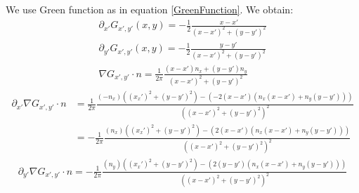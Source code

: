 \documentclass[a4paper,12pt]{article}
\begin{document}
We use Green function as in equation \ref{GreenFunction}. We obtain:
\begin{align}
 \partial_{x'} G_{x',y'}(x,y)=-\frac{1}{2}\frac{x-x'}{(x-x')^2+(y-y')^2}\\ \label{partialxaG}
\partial_{y'} G_{x',y'}(x,y)=-\frac{1}{2}\frac{y-y'}{(x-x')^2+(y-y')^2} \\ \label{partialyaG}
\nabla G_{x',y'} \cdot n= \frac{1}{2\pi} \frac{(x-x')n_x+(y-y')n_y}{(x-x')^2+(y-y')^2}
\end{align}
\begin{align}
 \partial_{x'}\nabla G_{x',y'} \cdot n &=\frac{1}{2\pi} \frac{(-n_x)((x_x')^2+(y-y')^2)-(-2(x-x')(n_x(x-x')+n_y(y-y')))}{((x-x')^2+(y-y')^2)^2}\\
&= -\frac{1}{2\pi}  \frac{(n_x)((x_x')^2+(y-y')^2)-(2(x-x')(n_x(x-x')+n_y(y-y')))}{((x-x')^2+(y-y')^2)^2} \label{partialxaNablaGn}
\end{align}
\begin{align}
 \partial_{y'}\nabla G_{x',y'} \cdot n =-\frac{1}{2\pi}  \frac{(n_y)((x_x')^2+(y-y')^2)-(2(y-y')(n_x(x-x')+n_y(y-y')))}{((x-x')^2+(y-y')^2)^2}\label{partialyaNablaGn}
\end{align}
\end{document}
